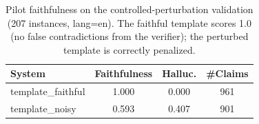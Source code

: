 \begin{table}[t]
\centering
\small
\begin{tabular}{lccc}
\toprule
System & Faithfulness & Halluc. & \#Claims \\
\midrule
template\_faithful & 1.000 & 0.000 & 961 \\
template\_noisy & 0.593 & 0.407 & 901 \\
\bottomrule
\end{tabular}
\caption{Pilot faithfulness on the controlled-perturbation validation (207 instances, lang=en). The faithful template scores 1.0 (no false contradictions from the verifier); the perturbed template is correctly penalized.}
\label{tab:pilot}
\end{table}
